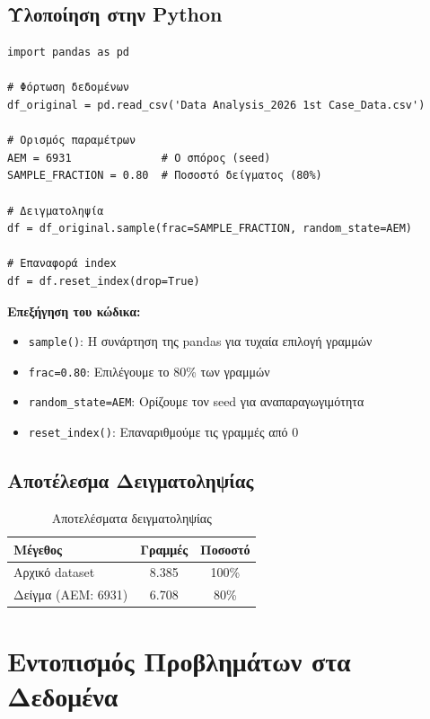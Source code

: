 \documentclass[12pt,a4paper]{article}
\begin{document}
\subsection{Υλοποίηση στην Python}

\begin{lstlisting}[caption={Κώδικας δειγματοληψίας}]
import pandas as pd

# Φόρτωση δεδομένων
df_original = pd.read_csv('Data Analysis_2026 1st Case_Data.csv')

# Ορισμός παραμέτρων
AEM = 6931              # Ο σπόρος (seed)
SAMPLE_FRACTION = 0.80  # Ποσοστό δείγματος (80%)

# Δειγματοληψία
df = df_original.sample(frac=SAMPLE_FRACTION, random_state=AEM)

# Επαναφορά index
df = df.reset_index(drop=True)
\end{lstlisting}

\textbf{Επεξήγηση του κώδικα:}
\begin{itemize}
    \item \texttt{sample()}: Η συνάρτηση της pandas για τυχαία επιλογή γραμμών
    \item \texttt{frac=0.80}: Επιλέγουμε το 80\% των γραμμών
    \item \texttt{random\_state=AEM}: Ορίζουμε τον seed για αναπαραγωγιμότητα
    \item \texttt{reset\_index()}: Επαναριθμούμε τις γραμμές από 0
\end{itemize}

\subsection{Αποτέλεσμα Δειγματοληψίας}

\begin{table}[H]
\centering
\caption{Αποτελέσματα δειγματοληψίας}
\begin{tabular}{@{}lcc@{}}
\toprule
\textbf{Μέγεθος} & \textbf{Γραμμές} & \textbf{Ποσοστό} \\
\midrule
Αρχικό dataset & 8.385 & 100\% \\
Δείγμα (ΑΕΜ: 6931) & 6.708 & 80\% \\
\bottomrule
\end{tabular}
\end{table}

\section{Εντοπισμός Προβλημάτων στα Δεδομένα}
\end{document}
